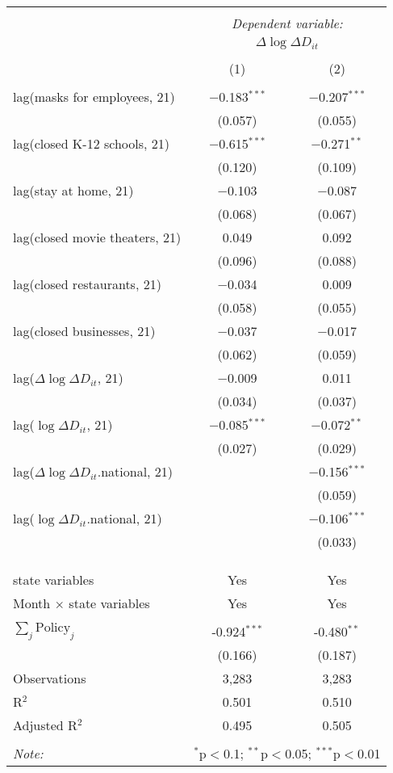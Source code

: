 \begin{tabular}{@{\extracolsep{1pt}}lcc} 
\\[-1.8ex]\hline 
\hline \\[-1.8ex] 
 & \multicolumn{2}{c}{\textit{Dependent variable:}} \\ 
\cline{2-3} 
 & \multicolumn{2}{c}{$\Delta \log \Delta D_{it}$} \\ 
\\[-1.8ex] & (1) & (2)\\ 
\hline \\[-1.8ex] 
 lag(masks for employees, 21) & $-$0.183$^{***}$ & $-$0.207$^{***}$ \\ 
  & (0.057) & (0.055) \\ 
  lag(closed K-12 schools, 21) & $-$0.615$^{***}$ & $-$0.271$^{**}$ \\ 
  & (0.120) & (0.109) \\ 
  lag(stay at home, 21) & $-$0.103 & $-$0.087 \\ 
  & (0.068) & (0.067) \\ 
  lag(closed movie theaters, 21) & 0.049 & 0.092 \\ 
  & (0.096) & (0.088) \\ 
  lag(closed restaurants, 21) & $-$0.034 & 0.009 \\ 
  & (0.058) & (0.055) \\ 
  lag(closed businesses, 21) & $-$0.037 & $-$0.017 \\ 
  & (0.062) & (0.059) \\ 
  lag($\Delta \log \Delta D_{it}$, 21) & $-$0.009 & 0.011 \\ 
  & (0.034) & (0.037) \\ 
  lag($\log \Delta D_{it}$, 21) & $-$0.085$^{***}$ & $-$0.072$^{**}$ \\ 
  & (0.027) & (0.029) \\ 
  lag($\Delta \log \Delta D_{it}$.national, 21) &  & $-$0.156$^{***}$ \\ 
  &  & (0.059) \\ 
  lag($\log \Delta D_{it}$.national, 21) &  & $-$0.106$^{***}$ \\ 
  &  & (0.033) \\ 
   &  &  \\ 
  &  &  \\ 
 \hline \\[-1.8ex] 
state variables & Yes & Yes \\ 
Month $\times$ state variables & Yes & Yes \\ 
\hline \\[-1.8ex] 
$\sum_j \mathrm{Policy}_j$ & -0.924$^{***}$ & -0.480$^{**}$ \\ 
 & (0.166) & (0.187) \\ 
Observations & 3,283 & 3,283 \\ 
R$^{2}$ & 0.501 & 0.510 \\ 
Adjusted R$^{2}$ & 0.495 & 0.505 \\ 
\hline 
\hline \\[-1.8ex] 
\textit{Note:}  & \multicolumn{2}{r}{$^{*}$p$<$0.1; $^{**}$p$<$0.05; $^{***}$p$<$0.01} \\ 
\end{tabular} 